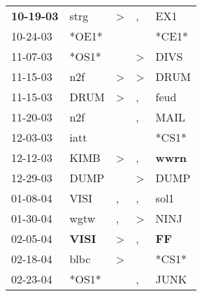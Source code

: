 \begin{supertabular}{p{0.07\textwidth}p{0.06\textwidth}p{0.02\textwidth}p{0.02\textwidth}p{0.06\textwidth}}
 \textbf{10-19-03\textsuperscript{}} &           strg\textsuperscript{} &     \textgreater &                , &            EX1\textsuperscript{} \\
          10-24-03\textsuperscript{} &                            *OE1* &                  &                  &                            *CE1* \\
          11-07-03\textsuperscript{} &                            *OS1* &                  &     \textgreater &           DIVS\textsuperscript{} \\
          11-15-03\textsuperscript{} &            n2f\textsuperscript{} &     \textgreater &     \textgreater &           DRUM\textsuperscript{} \\
          11-15-03\textsuperscript{} &           DRUM\textsuperscript{} &     \textgreater &                , &           feud\textsuperscript{} \\
          11-20-03\textsuperscript{} &            n2f\textsuperscript{} &                  &                , &           MAIL\textsuperscript{} \\
          12-03-03\textsuperscript{} &           iatt\textsuperscript{} &                  &                  &                            *CS1* \\
          12-12-03\textsuperscript{} &           KIMB\textsuperscript{} &     \textgreater &                , &  \textbf{wwrn\textsuperscript{}} \\
          12-29-03\textsuperscript{} &           DUMP\textsuperscript{} &                  &     \textgreater &           DUMP\textsuperscript{} \\
          01-08-04\textsuperscript{} &           VISI\textsuperscript{} &                , &                , &           sol1\textsuperscript{} \\
          01-30-04\textsuperscript{} &           wgtw\textsuperscript{} &                , &     \textgreater &           NINJ\textsuperscript{} \\
          02-05-04\textsuperscript{} &  \textbf{VISI\textsuperscript{}} &     \textgreater &                , &    \textbf{FF\textsuperscript{}} \\
          02-18-04\textsuperscript{} &           blbc\textsuperscript{} &     \textgreater &                  &                            *CS1* \\
          02-23-04\textsuperscript{} &                            *OS1* &                  &                , &           JUNK\textsuperscript{} \\

\end{supertabular}
